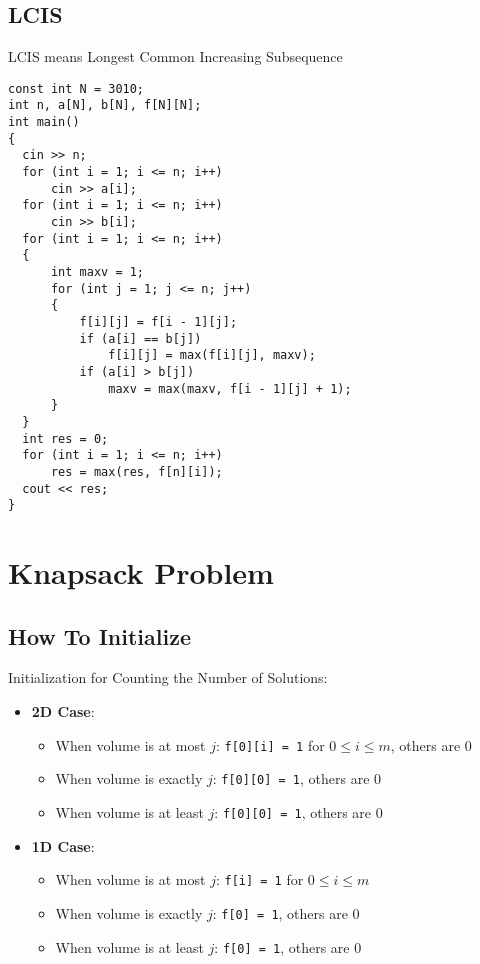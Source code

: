 \subsection{LCIS}
LCIS means Longest Common Increasing Subsequence
\begin{lstlisting}
const int N = 3010;
int n, a[N], b[N], f[N][N];
int main()
{
  cin >> n;
  for (int i = 1; i <= n; i++)
      cin >> a[i];
  for (int i = 1; i <= n; i++)
      cin >> b[i];
  for (int i = 1; i <= n; i++)
  {
      int maxv = 1;
      for (int j = 1; j <= n; j++)
      {
          f[i][j] = f[i - 1][j];
          if (a[i] == b[j])
              f[i][j] = max(f[i][j], maxv);
          if (a[i] > b[j])
              maxv = max(maxv, f[i - 1][j] + 1);
      }
  }
  int res = 0;
  for (int i = 1; i <= n; i++)
      res = max(res, f[n][i]);
  cout << res;
}
\end{lstlisting}
\section{Knapsack Problem}
\subsection{How To Initialize}

Initialization for Counting the Number of Solutions:

\begin{itemize}
    \item \textbf{2D Case}:
    \begin{itemize}
      \item When volume is at most $j$: \texttt{f[0][i] = 1} for $0 \leq i \leq m$, others are 0
      \item When volume is exactly $j$: \texttt{f[0][0] = 1}, others are 0
      \item When volume is at least $j$: \texttt{f[0][0] = 1}, others are 0
    \end{itemize}
    
    \item \textbf{1D Case}:
    \begin{itemize}
      \item When volume is at most $j$: \texttt{f[i] = 1} for $0 \leq i \leq m$
      \item When volume is exactly $j$: \texttt{f[0] = 1}, others are 0
      \item When volume is at least $j$: \texttt{f[0] = 1}, others are 0
    \end{itemize}
\end{itemize}

